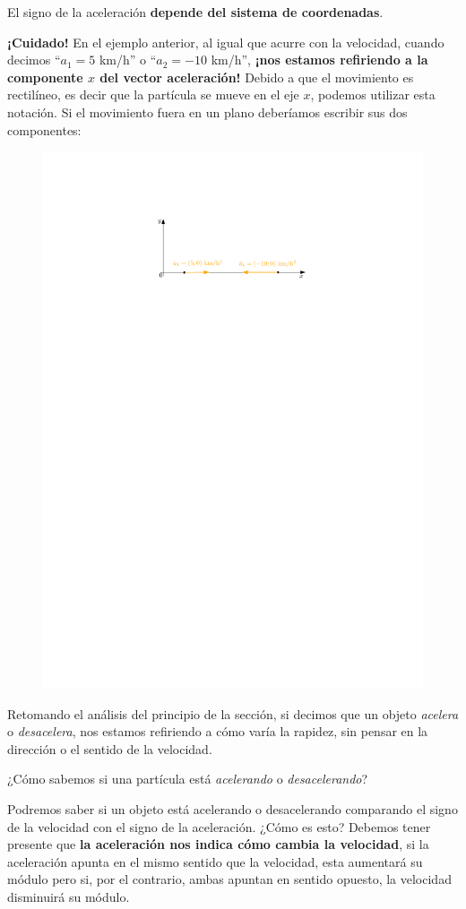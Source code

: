 El signo de la aceleración \textbf{depende del sistema de coordenadas}.


{\bf \color{BrickRed} {¡Cuidado!}} En el ejemplo anterior, al igual que acurre con la velocidad, cuando decimos ``$a_1= 5$ km/h'' o ``$a_2= -10$ km/h'', {\bf ¡nos estamos refiriendo a la componente $x$ del vector aceleración!} Debido a que el movimiento es rectilíneo, es decir que la partícula se mueve en el eje $x$, podemos utilizar esta notación. Si el movimiento fuera en un plano deberíamos escribir sus dos componentes:

\begin{figure}[h!]
\centering
 \includegraphics[width=.6\textwidth]{img/acomp2.pdf}
\end{figure}



Retomando el análisis del principio de la sección, si decimos que un objeto {\it acelera} o {\it desacelera}, nos estamos refiriendo a cómo varía la rapidez, sin pensar en la dirección o el sentido de la velocidad. 

¿Cómo sabemos si una partícula está \textit{acelerando} o \textit{desacelerando}?

    
Podremos saber si un objeto está acelerando o desacelerando comparando el signo de la velocidad con el signo de la aceleración. ¿Cómo es esto? Debemos tener presente que \textbf{la aceleración nos indica cómo cambia la velocidad}, si la aceleración apunta en el mismo sentido que la velocidad, esta aumentará su módulo pero si, por el contrario, ambas apuntan en sentido opuesto, la velocidad disminuirá su módulo.

